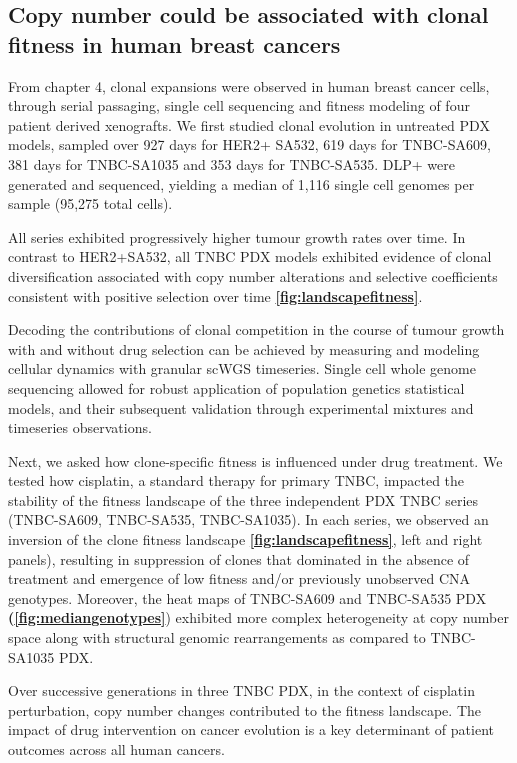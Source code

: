 \subsection{Copy number could be associated with clonal fitness in  human breast cancers}
From chapter 4, clonal expansions were observed in human breast cancer cells, through serial passaging, single cell sequencing and fitness modeling of four patient derived xenografts. 
We first studied clonal evolution in untreated PDX models, sampled over 927 days for HER2+ SA532, 619 days for TNBC-SA609, 381 days for TNBC-SA1035 and 353 days for TNBC-SA535. DLP+ were generated and sequenced, yielding a median of 1,116 single cell genomes per sample (95,275 total cells). 

All series exhibited progressively higher tumour growth rates over time. In contrast to HER2+SA532, all TNBC PDX models exhibited evidence of clonal diversification associated with copy number alterations and selective coefficients consistent with positive selection over time \textbf{\autoref{fig:landscapefitness}}. 

Decoding the contributions of clonal competition in the course of tumour growth with and without drug selection can be achieved by measuring and modeling cellular dynamics with granular scWGS timeseries.
Single cell whole genome sequencing allowed for robust application of population genetics statistical models, and their subsequent validation through experimental mixtures and timeseries observations.
 
 Next, we asked how clone-specific fitness is influenced under drug treatment. We tested how cisplatin, a standard therapy for primary TNBC, impacted the stability of the fitness landscape of the three independent PDX TNBC series (TNBC-SA609, TNBC-SA535, TNBC-SA1035).
In each series, we observed an inversion of the clone fitness landscape \textbf{\autoref{fig:landscapefitness}}, left and right panels), resulting in suppression of clones that dominated in the absence of treatment and emergence of low fitness and/or previously unobserved CNA genotypes. Moreover, the heat maps of TNBC-SA609 and TNBC-SA535 PDX \textbf{(\autoref{fig:mediangenotypes}}) exhibited more complex heterogeneity at copy number space along with structural genomic rearrangements as compared to TNBC-SA1035 PDX.


Over successive generations in three TNBC PDX, in the context of cisplatin perturbation, copy number changes contributed to the fitness landscape. 
The impact of drug intervention on cancer evolution is a key determinant of patient outcomes across all human cancers. 


